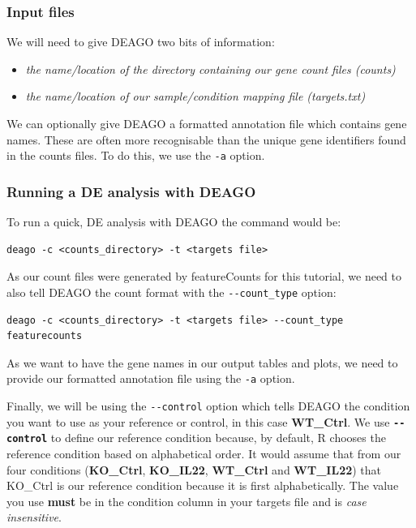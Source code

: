 \documentclass[11pt]{article}
\begin{document}
\hypertarget{input-files}{%
\subsubsection{Input files}\label{input-files}}

We will need to give DEAGO two bits of information:

\begin{itemize}
\item
  \textit{the name/location of the directory containing our gene count
  files (counts)}
\item
  \textit{the name/location of our sample/condition mapping file
  (targets.txt)}
\end{itemize}

We can optionally give DEAGO a formatted annotation file which contains
gene names. These are often more recognisable than the unique gene
identifiers found in the counts files. To do this, we use the
\texttt{-a} option.

\hypertarget{running-a-de-analysis-with-deago}{%
\subsubsection{Running a DE analysis with
DEAGO}\label{running-a-de-analysis-with-deago}}

To run a quick, DE analysis with DEAGO the command would be:

\begin{verbatim}
deago -c <counts_directory> -t <targets file>
\end{verbatim}

As our count files were generated by featureCounts for this tutorial, we
need to also tell DEAGO the count format with the
\texttt{-\/-count\_type} option:

\begin{verbatim}
deago -c <counts_directory> -t <targets file> --count_type featurecounts
\end{verbatim}

As we want to have the gene names in our output tables and plots, we
need to provide our formatted annotation file using the \texttt{-a}
option.

Finally, we will be using the \texttt{-\/-control} option which tells
DEAGO the condition you want to use as your reference or control, in
this case \textbf{WT\_Ctrl}. We use \textbf{\texttt{-\/-control}} to
define our reference condition because, by default, R chooses the
reference condition based on alphabetical order. It would assume that
from our four conditions (\textbf{KO\_Ctrl}, \textbf{KO\_IL22},
\textbf{WT\_Ctrl} and \textbf{WT\_IL22}) that KO\_Ctrl is our reference
condition because it is first alphabetically. The value you use
\textbf{must} be in the condition column in your targets file and is
\textit{case insensitive}.
\end{document}

